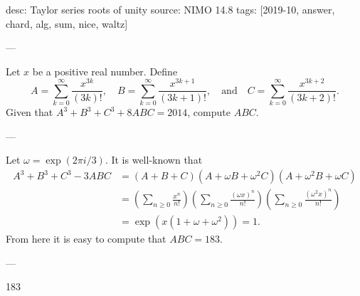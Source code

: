 desc: Taylor series roots of unity
source: NIMO 14.8
tags: [2019-10, answer, chard, alg, sum, nice, waltz]

---

Let $x$ be a positive real number. Define \[A=\sum_{k=0}^\infty\frac{x^{3k}}{(3k)!},\quad B=\sum_{k=0}^\infty\frac{x^{3k+1}}{(3k+1)!},\quad\text{and}\quad C=\sum_{k=0}^\infty\frac{x^{3k+2}}{(3k+2)!}.\]
Given that $A^3+B^3+C^3+8ABC=2014$, compute $ABC$.

---

Let $\omega=\exp(2\pi i/3)$. It is well-known that
\begin{align*}
    A^3+B^3+C^3-3ABC&=(A+B+C)(A+\omega B+\omega^2 C)(A+\omega^2 B+\omega C)\\
    &=\left(\sum_{n\ge0}\frac{x^n}{n!}\right)\left(\sum_{n\ge0}\frac{(\omega x)^n}{n!}\right)\left(\sum_{n\ge0}\frac{(\omega^2x)^n}{n!}\right)\\
    &=\exp\left(x(1+\omega+\omega^2)\right)=1.
\end{align*}
From here it is easy to compute that $ABC=183$.

---

183
